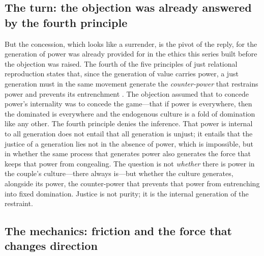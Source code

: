 \subsection*{The turn: the objection was already answered by the fourth principle}

But the concession, which looks like a surrender, is the pivot of the reply, for the generation of power was already provided for in the ethics this series built before the objection was raised. The fourth of the five principles of just relational reproduction states that, since the generation of value carries power, a just generation must in the same movement generate the \emph{counter-power} that restrains power and prevents its entrenchment \parencite{paperix}. The objection assumed that to concede power's internality was to concede the game---that if power is everywhere, then the dominated is everywhere and the endogenous culture is a fold of domination like any other. The fourth principle denies the inference. That power is internal to all generation does not entail that all generation is unjust; it entails that the justice of a generation lies not in the absence of power, which is impossible, but in whether the same process that generates power also generates the force that keeps that power from congealing. The question is not \emph{whether} there is power in the couple's culture---there always is---but whether the culture generates, alongside its power, the counter-power that prevents that power from entrenching into fixed domination. Justice is not purity; it is the internal generation of the restraint.

\subsection*{The mechanics: friction and the force that changes direction}

